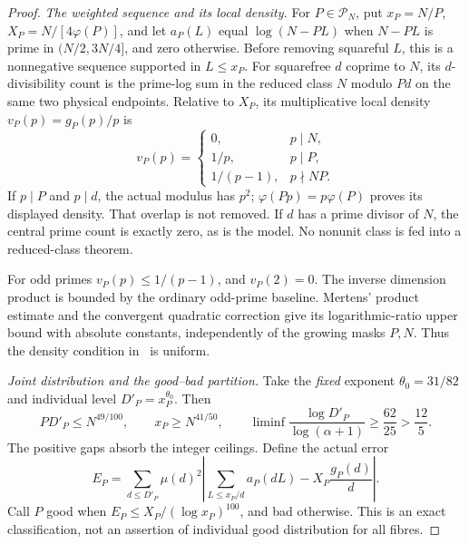 \documentclass[11pt,a4paper]{article}
\theoremstyle{definition}
\theoremstyle{remark}
\begin{document}
\begin{proof}
\emph{The weighted sequence and its local density.}
For $P\in\mathcal P_N$, put $x_P=N/P$,
$X_P=N/[4\varphi(P)]$, and let $a_P(L)$ equal $\log(N-PL)$
when $N-PL$ is prime in $(N/2,3N/4]$, and zero otherwise.  Before
removing squareful $L$, this is a nonnegative sequence supported
in $L\leq x_P$.  For squarefree $d$ coprime to $N$, its
$d$-divisibility count is the prime-log sum in the reduced class
$N$ modulo $Pd$ on the same two physical endpoints.  Relative to
$X_P$, its multiplicative local density $v_P(p)=g_P(p)/p$ is
\begin{equation}
 v_P(p)=
 \begin{cases}
 0,&p\mid N,\\
 1/p,&p\mid P,\\
 1/(p-1),&p\nmid NP.
 \end{cases}
 \label{eq:sector-local-density}
\end{equation}
If $p\mid P$ and $p\mid d$, the actual modulus has $p^2$;
$\varphi(Pp)=p\varphi(P)$ proves its displayed density.  That
overlap is not removed.  If $d$ has a prime divisor of $N$, the
central prime count is exactly zero, as is the model.  No nonunit
class is fed into a reduced-class theorem.

For odd primes $v_P(p)\leq1/(p-1)$, and $v_P(2)=0$.  The inverse
dimension product is bounded by the ordinary odd-prime baseline.
Mertens' product estimate and the convergent quadratic correction
give its logarithmic-ratio upper bound with absolute constants,
independently of the growing masks $P,N$.  Thus the density
condition in~\cite[Definition 2.4]{MTZ} is uniform.

\emph{Joint distribution and the good--bad partition.}
Take the \emph{fixed} exponent $\theta_0=31/82$ and individual
level $D'_P=x_P^{\theta_0}$.  Then
\begin{equation}
 PD'_P\leq N^{49/100},\qquad
 x_P\geq N^{41/50},\qquad
 \liminf\frac{\log D'_P}{\log(\alpha+1)}\geq\frac{62}{25}>\frac{12}{5}.
 \label{eq:sector-level-gaps}
\end{equation}
The positive gaps absorb the integer ceilings.  Define the actual error
\[
 E_P=\sum_{d\leq D'_P}\mu(d)^2
       \left|\sum_{L\leq x_P/d}a_P(dL)-X_P\frac{g_P(d)}d\right|.
\]
Call $P$ good when $E_P\leq X_P/(\log x_P)^{100}$, and bad
otherwise.  This is an exact classification, not an assertion of
individual good distribution for all fibres.


\end{proof}
\end{document}
